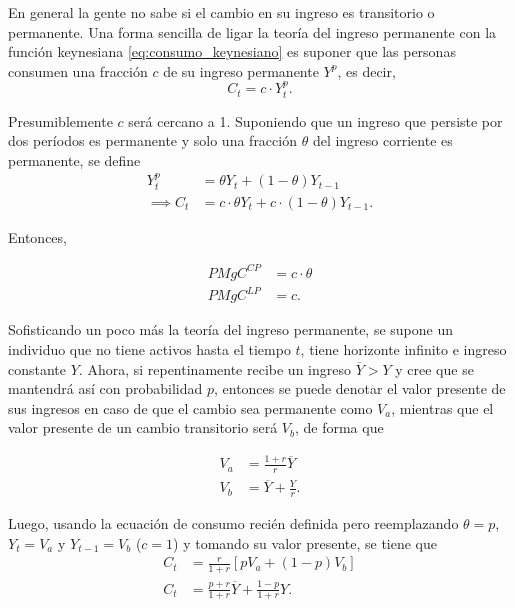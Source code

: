 \documentclass[DeGregorioResumen]{subfiles}
\begin{document}
En general la gente no sabe si el cambio en su ingreso es transitorio o permanente. Una forma sencilla de ligar la teoría del ingreso permanente con la función keynesiana \eqref{eq:consumo_keynesiano} es suponer que las personas consumen una fracción $c$ de su ingreso permanente $Y^p$, es decir,
\begin{equation*}
C_t=c\cdot Y^p_t.
\end{equation*}

Presumiblemente $c$ será cercano a 1. Suponiendo que un ingreso que persiste por dos períodos es permanente y solo una fracción $\theta$ del ingreso corriente es permanente, se define
\begin{align*}
Y^p_t &= \theta Y_t+(1-\theta)Y_{t-1} \\
\implies C_t &= c\cdot \theta Y_t+c\cdot(1-\theta)Y_{t-1}.
\end{align*}

Entonces,

\begin{align*}
PMgC^{CP} &= c\cdot\theta \\
PMgC^{LP} &= c.
\end{align*}

Sofisticando un poco más la teoría del ingreso permanente, se supone un individuo que no tiene activos hasta el tiempo $t$, tiene horizonte infinito e ingreso constante $Y$. Ahora, si repentinamente recibe un ingreso $\overline{Y}>Y$ y cree que se mantendrá así con probabilidad $p$, entonces se puede denotar el valor presente de sus ingresos en caso de que el cambio sea permanente como $V_a$, mientras que el valor presente de un cambio transitorio será $V_b$, de forma que

\begin{align*}
V_a &= \frac{1+r}{r}\overline{Y} \\
V_b &= \overline{Y}+\frac{Y}{r}.
\end{align*}

Luego, usando la ecuación de consumo recién definida pero reemplazando $\theta=p$, $Y_t=V_a$ y $Y_{t-1}=V_b$ ($c=1$) y tomando su valor presente, se tiene que
\begin{align*}
C_t &= \frac{r}{1+r}\left[pV_a+(1-p)V_b\right] \\
C_t &= \frac{p+r}{1+r}\overline{Y}+\frac{1-p}{1+r}Y.
\end{align*}
\end{document}
